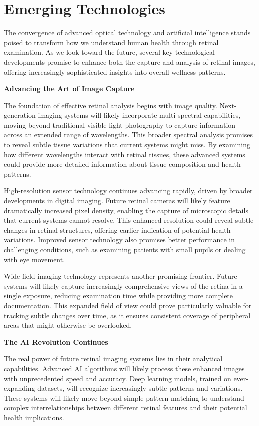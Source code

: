 \documentclass[
  Letterpaper,
]{scrbook}
\begin{document}
\section{Emerging Technologies}\label{emerging-technologies}

The convergence of advanced optical technology and artificial
intelligence stands poised to transform how we understand human health
through retinal examination. As we look toward the future, several key
technological developments promise to enhance both the capture and
analysis of retinal images, offering increasingly sophisticated insights
into overall wellness patterns.

\textbf{Advancing the Art of Image Capture}

The foundation of effective retinal analysis begins with image quality.
Next-generation imaging systems will likely incorporate multi-spectral
capabilities, moving beyond traditional visible light photography to
capture information across an extended range of wavelengths. This
broader spectral analysis promises to reveal subtle tissue variations
that current systems might miss. By examining how different wavelengths
interact with retinal tissues, these advanced systems could provide more
detailed information about tissue composition and health patterns.

High-resolution sensor technology continues advancing rapidly, driven by
broader developments in digital imaging. Future retinal cameras will
likely feature dramatically increased pixel density, enabling the
capture of microscopic details that current systems cannot resolve. This
enhanced resolution could reveal subtle changes in retinal structures,
offering earlier indication of potential health variations. Improved
sensor technology also promises better performance in challenging
conditions, such as examining patients with small pupils or dealing with
eye movement.

Wide-field imaging technology represents another promising frontier.
Future systems will likely capture increasingly comprehensive views of
the retina in a single exposure, reducing examination time while
providing more complete documentation. This expanded field of view could
prove particularly valuable for tracking subtle changes over time, as it
ensures consistent coverage of peripheral areas that might otherwise be
overlooked.

\textbf{The AI Revolution Continues}

The real power of future retinal imaging systems lies in their
analytical capabilities. Advanced AI algorithms will likely process
these enhanced images with unprecedented speed and accuracy. Deep
learning models, trained on ever-expanding datasets, will recognize
increasingly subtle patterns and variations. These systems will likely
move beyond simple pattern matching to understand complex
interrelationships between different retinal features and their
potential health implications.
\end{document}
